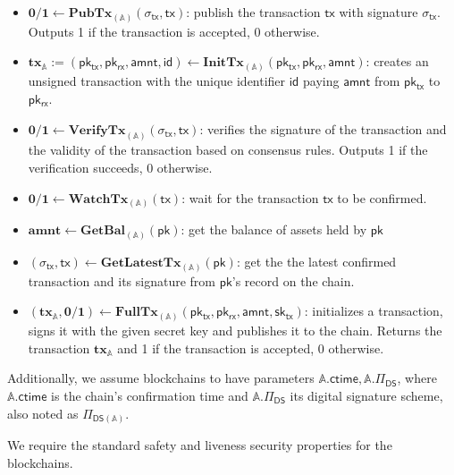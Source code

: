\documentclass{article}      	%
\begin{document}
\begin{itemize}[topsep=0pt, itemsep=0pt, leftmargin=2em]
    \item $\mathbf{0/1} \gets \mathbf{PubTx}_{(\mathbb{A})}(\sigma_{\mathsf{tx}}, \mathsf{tx})$: publish the transaction $\mathsf{tx}$ with signature $\sigma_{\mathsf{tx}}$. Outputs 1 if the transaction is accepted, 0 otherwise.
    \item $\mathbf{tx}_{\mathbb{A}} := (\mathsf{pk_{tx}}, \mathsf{pk_{rx}}, \mathsf{amnt}, \mathsf{id})  \gets \mathbf{InitTx}_{(\mathbb{A})}(\mathsf{pk_{tx}}, \mathsf{pk_{rx}}, \mathsf{amnt})$: creates an unsigned transaction with the unique identifier $\mathsf{id}$ paying $\mathsf{amnt}$ from $\mathsf{pk_{tx}}$ to $\mathsf{pk_{rx}}$.
    \item $\mathbf{0/1} \gets \mathbf{VerifyTx}_{(\mathbb{A})}(\sigma_{\mathsf{tx}}, \mathsf{tx})$: verifies the signature of the transaction and the validity of the transaction based on consensus rules. Outputs 1 if the verification succeeds, 0 otherwise.
    \item $\mathbf{0/1} \gets \mathbf{WatchTx}_{(\mathbb{A})}(\mathsf{tx})$: wait for the transaction $\mathsf{tx}$ to be confirmed.
    \item $\mathbf{amnt} \gets \mathbf{GetBal}_{(\mathbb{A})}(\mathsf{pk})$: get the balance of assets held by $\mathsf{pk}$
    \item $(\sigma_{\mathsf{tx}}, \mathsf{tx}) \gets \mathbf{GetLatestTx}_{(\mathbb{A})}(\mathsf{pk})$: get the the latest confirmed transaction and its signature from $\mathsf{pk}$'s record on the chain.
    \item $(\mathbf{tx}_{\mathbb{A}}, \mathbf{0/1})  \gets \mathbf{FullTx}_{(\mathbb{A})}(\mathsf{pk_{tx}}, \mathsf{pk_{rx}}, \mathsf{amnt}, \mathsf{sk_{tx}})$: initializes a transaction, signs it with the given secret key and publishes it to the chain. Returns the transaction $\mathbf{tx}_{\mathbb{A}}$ and 1 if the transaction is accepted, 0 otherwise.
\end{itemize}

Additionally, we assume blockchains to have parameters $\mathbb{A}.\mathsf{ctime}, \mathbb{A}.\Pi_\mathsf{DS}$, where $\mathbb{A}.\mathsf{ctime}$ is the chain's confirmation time and $\mathbb{A}.\Pi_\mathsf{DS}$ its digital signature scheme, also noted as $\Pi_\mathsf{DS(\mathbb{A})}$.

We require the standard safety and liveness security properties for the blockchains.
\end{document}
